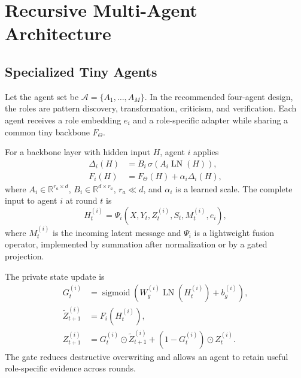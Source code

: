\documentclass[10pt,a4paper,twocolumn]{article}
\newcommand{\R}{\mathbb{R}}
\newcommand{\sigmoid}{\operatorname{sigmoid}}
\newcommand{\LN}{\operatorname{LN}}
\begin{document}
\section{Recursive Multi-Agent Architecture}
\subsection{Specialized Tiny Agents}
Let the agent set be $\mathcal{A}=\{A_1,\ldots,A_M\}$. In the recommended four-agent design, the roles are pattern discovery, transformation, criticism, and verification. Each agent receives a role embedding $e_i$ and a role-specific adapter while sharing a common tiny backbone $F_\Theta$.

For a backbone layer with hidden input $H$, agent $i$ applies
\begin{align}
\Delta_i(H) &= B_i\,\sigma\!\left(A_i\LN(H)\right), \label{eq:role_adapter}\\
F_i(H) &= F_\Theta(H)+\alpha_i\Delta_i(H), \label{eq:role_conditioned}
\end{align}
where $A_i\in\R^{r_a\times d}$, $B_i\in\R^{d\times r_a}$, $r_a\ll d$, and $\alpha_i$ is a learned scale. The complete input to agent $i$ at round $t$ is
\begin{equation}
H_t^{(i)}=\Psi_i\left(X,Y_t,Z_t^{(i)},S_t,M_t^{(i)},e_i\right), \label{eq:agent_input}
\end{equation}
where $M_t^{(i)}$ is the incoming latent message and $\Psi_i$ is a lightweight fusion operator, implemented by summation after normalization or by a gated projection.

The private state update is
\begin{align}
G_t^{(i)} &= \sigmoid\left(W_g^{(i)}\LN(H_t^{(i)})+b_g^{(i)}\right), \\
\widetilde Z_{t+1}^{(i)} &= F_i(H_t^{(i)}), \\
Z_{t+1}^{(i)} &= G_t^{(i)}\odot\widetilde Z_{t+1}^{(i)}+
\left(1-G_t^{(i)}\right)\odot Z_t^{(i)}. \label{eq:private_update}
\end{align}
The gate reduces destructive overwriting and allows an agent to retain useful role-specific evidence across rounds.
\end{document}
